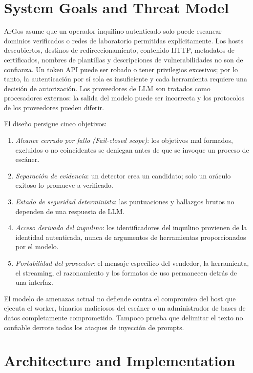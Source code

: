\documentclass[conference,a4paper]{IEEEtran}
\newcommand{\argos}{ArGos\xspace}
\begin{document}
\section{System Goals and Threat Model}

\argos asume que un operador inquilino autenticado solo puede escanear dominios verificados o redes de laboratorio permitidas explícitamente. Los hosts descubiertos, destinos de redireccionamiento, contenido HTTP, metadatos de certificados, nombres de plantillas y descripciones de vulnerabilidades no son de confianza. Un token API puede ser robado o tener privilegios excesivos; por lo tanto, la autenticación por sí sola es insuficiente y cada herramienta requiere una decisión de autorización. Los proveedores de LLM son tratados como procesadores externos: la salida del modelo puede ser incorrecta y los protocolos de los proveedores pueden diferir.

El diseño persigue cinco objetivos:
\begin{enumerate}
    \item \textit{Alcance cerrado por fallo (Fail-closed scope)}: los objetivos mal formados, excluidos o no coincidentes se deniegan antes de que se invoque un proceso de escáner.
    \item \textit{Separación de evidencia}: un detector crea un candidato; solo un oráculo exitoso lo promueve a verificado.
    \item \textit{Estado de seguridad determinista}: las puntuaciones y hallazgos brutos no dependen de una respuesta de LLM.
    \item \textit{Acceso derivado del inquilino}: los identificadores del inquilino provienen de la identidad autenticada, nunca de argumentos de herramientas proporcionados por el modelo.
    \item \textit{Portabilidad del proveedor}: el mensaje específico del vendedor, la herramienta, el streaming, el razonamiento y los formatos de uso permanecen detrás de una interfaz.
\end{enumerate}

El modelo de amenazas actual no defiende contra el compromiso del host que ejecuta el worker, binarios maliciosos del escáner o un administrador de bases de datos completamente comprometido. Tampoco prueba que delimitar el texto no confiable derrote todos los ataques de inyección de prompts.

\section{Architecture and Implementation}
\end{document}
